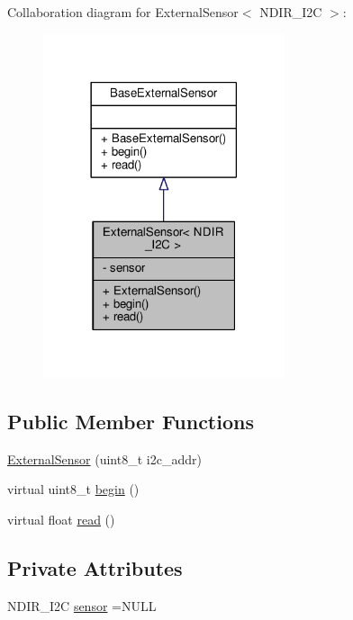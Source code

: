 Collaboration diagram for External\+Sensor$<$ N\+D\+I\+R\+\_\+\+I2C $>$\+:
\nopagebreak
\begin{figure}[H]
\begin{center}
\leavevmode
\includegraphics[width=201pt]{classExternalSensor_3_01NDIR__I2C_01_4__coll__graph}
\end{center}
\end{figure}
\subsection*{Public Member Functions}
\begin{DoxyCompactItemize}
\item 
\hyperlink{classExternalSensor_3_01NDIR__I2C_01_4_aa06970ea689679c0e1deb5360e05a0a4}{External\+Sensor} (uint8\+\_\+t i2c\+\_\+addr)
\item 
virtual uint8\+\_\+t \hyperlink{classExternalSensor_3_01NDIR__I2C_01_4_ac6f3614d94968ef0cc11b2b4d69cef03}{begin} ()
\item 
virtual float \hyperlink{classExternalSensor_3_01NDIR__I2C_01_4_a239d18652e9fb4673842ae9726edf44f}{read} ()
\end{DoxyCompactItemize}
\subsection*{Private Attributes}
\begin{DoxyCompactItemize}
\item 
N\+D\+I\+R\+\_\+\+I2C \hyperlink{classExternalSensor_3_01NDIR__I2C_01_4_ae541c9cece7c38674b70114cdb74a7dc}{sensor} =N\+U\+LL
\end{DoxyCompactItemize}


